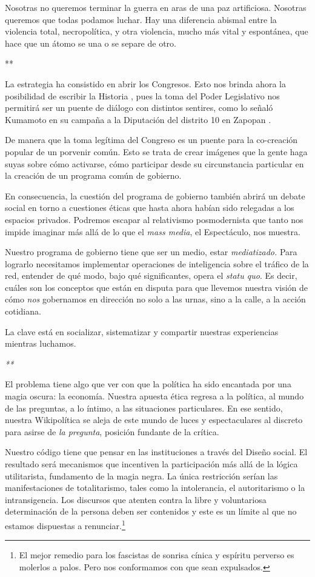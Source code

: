 Nosotras no queremos terminar la guerra en aras de una paz artificiosa.
Nosotras queremos que todas podamos luchar. Hay una diferencia abismal
entre la violencia total, necropolítica, y otra violencia, mucho más
vital y espontánea, que hace que un átomo se una o se separe de otro.

**

La estrategia ha consistido en abrir los Congresos. Esto nos brinda
ahora la posibilidad de escribir la Historia \cite{HegelFilosofiaHistoria2023},
pues la toma del Poder Legislativo nos permitirá ser un puente de
diálogo con distintos sentires, como lo señaló Kumamoto en su campaña a
la Diputación del distrito 10 en
Zapopan \cite{Gutierrez2016}.

De manera que la toma legítima del Congreso es un puente para la
co-creación popular de un porvenir común. Esto se trata de crear
imágenes que la gente haga suyas sobre cómo activarse, cómo participar
desde su circunstancia particular en la creación de un programa común de
gobierno.

En consecuencia, la cuestión del programa de gobierno también abrirá un
debate social en torno a cuestiones éticas que hasta ahora habían sido
relegadas a los espacios privados. Podremos escapar al relativismo
posmodernista que tanto nos impide imaginar más allá de lo que el
\emph{mass media}, el Espectáculo, nos muestra.

Nuestro programa de gobierno tiene que ser un medio, estar
\emph{mediatizado.} Para lograrlo necesitamos implementar operaciones de
inteligencia sobre el tráfico de la red, entender de qué modo, bajo qué
significantes, opera el \emph{statu quo}. Es decir, cuáles son los
conceptos que están en disputa para que llevemos nuestra visión de cómo
\emph{nos} gobernamos en dirección no solo a las urnas, sino a la calle,
a la acción cotidiana.

La clave está en socializar, sistematizar y compartir nuestras
experiencias mientras luchamos.

\emph{**}

El problema tiene algo que ver con que la política ha sido encantada por
una magia oscura: la economía. Nuestra apuesta ética regresa a la
política, al mundo de las preguntas, a lo íntimo, a las situaciones
particulares. En ese sentido, nuestra Wikipolítica se aleja de este
mundo de luces y espectaculares al discreto para asirse de \emph{la
pregunta}, posición fundante de la crítica.

Nuestro código tiene que pensar en las instituciones a través del Diseño
social. El resultado será mecanismos que incentiven la participación más
allá de la lógica utilitarista, fundamento de la magia negra. La única
restricción serían las manifestaciones de totalitarismo, tales como la
intolerancia, el autoritarismo o la intransigencia. Los discursos que
atenten contra la libre y voluntariosa determinación de la persona deben
ser contenidos y este es un límite al que no estamos dispuestas a
renunciar.\footnote{El mejor remedio para los fascistas de sonrisa
  cínica y espíritu perverso es molerlos a palos. Pero nos conformamos
  con que sean expulsados.}

